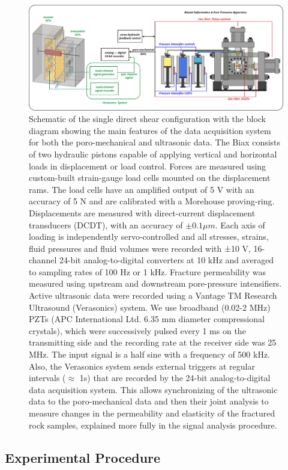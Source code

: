 \documentclass[letterpaper,10pt]{article}
\begin{document}
	\begin{figure}[ht]
		\centering
		\includegraphics[width=0.9 \columnwidth]{exp_daq_v1}
		\caption[]{Schematic of the single direct shear configuration with the block diagram showing the main features of the data acquisition system for both the poro-mechanical and ultrasonic data. The Biax consists of two hydraulic pistons capable of applying vertical and horizontal loads in displacement or load control. Forces are measured using custom-built strain-gauge load cells mounted on the displacement rams. The load cells have an amplified output of 5 V with an accuracy of 5 N and are calibrated with a Morehouse proving-ring. Displacements are measured with direct-current displacement transducers (DCDT), with an accuracy of $\pm 0.1 \mu m$. Each axis of loading is independently servo-controlled and all stresses, strains, fluid pressures and fluid volumes were recorded with ±10 V, 16-channel 24-bit analog-to-digital converters at 10 kHz and averaged to sampling rates of 100 Hz or 1 kHz. Fracture permeability was measured using upstream and downstream pore-pressure intensifiers. Active ultrasonic data were recorded using a Vantage TM Research Ultrasound (Verasonics) system. We use broadband (0.02-2 MHz) PZTs (APC International Ltd. 6.35 mm diameter compressional crystals), which were successively pulsed every 1 ms on the transmitting side and the recording rate at the receiver side was 25 MHz. The input signal is a half sine with a frequency of 500 kHz. Also, the Verasonics system sends external triggers at regular intervals ($\approx$ 1s) that are recorded by the 24-bit analog-to-digital data acquisition system. This allows synchronizing of the ultrasonic data to the poro-mechanical data and then their joint analysis to measure changes in the permeability and elasticity of the fractured rock samples, explained more fully in the signal analysis procedure.}
		\label{fig:data_aq}
	\end{figure}
	
	\newpage
	
	
	\subsection{Experimental Procedure}
\end{document}
